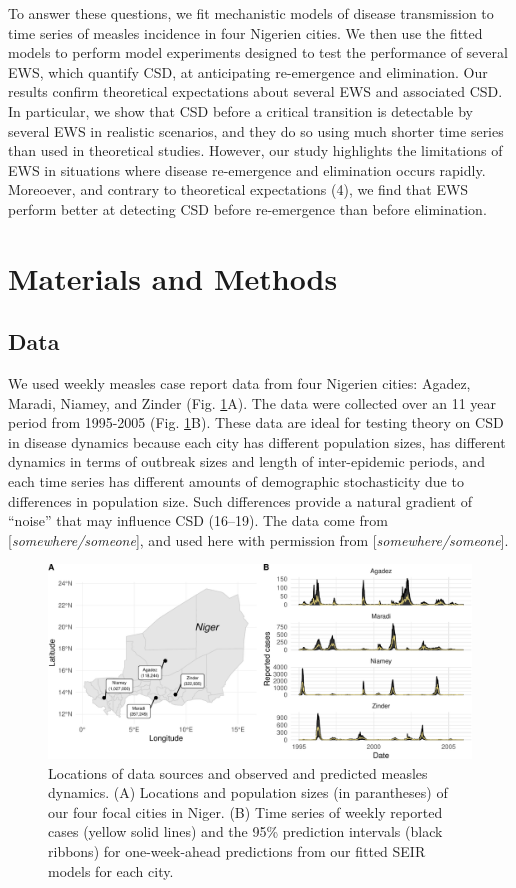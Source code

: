 \documentclass[3p]{elsarticle} %
\makeatletter
\def\maxwidth{\ifdim\Gin@nat@width>\linewidth\linewidth
\else\Gin@nat@width\fi}
\let\Oldincludegraphics\includegraphics
\renewcommand{\includegraphics}[1]{\Oldincludegraphics[width=\maxwidth]{#1}}
\makeatother
\begin{document}
To answer these questions, we fit mechanistic models of disease
transmission to time series of measles incidence in four Nigerien
cities. We then use the fitted models to perform model experiments
designed to test the performance of several EWS, which quantify CSD, at
anticipating re-emergence and elimination. Our results confirm
theoretical expectations about several EWS and associated CSD. In
particular, we show that CSD before a critical transition is detectable
by several EWS in realistic scenarios, and they do so using much shorter
time series than used in theoretical studies. However, our study
highlights the limitations of EWS in situations where disease
re-emergence and elimination occurs rapidly. Moreoever, and contrary to
theoretical expectations (4), we find that EWS perform better at
detecting CSD before re-emergence than before elimination.

\section{Materials and Methods}\label{materials-and-methods}

\subsection{Data}\label{data}

We used weekly measles case report data from four Nigerien cities:
Agadez, Maradi, Niamey, and Zinder (Fig. \ref{data-plot}A). The data
were collected over an 11 year period from 1995-2005 (Fig.
\ref{data-plot}B). These data are ideal for testing theory on CSD in
disease dynamics because each city has different population sizes, has
different dynamics in terms of outbreak sizes and length of
inter-epidemic periods, and each time series has different amounts of
demographic stochasticity due to differences in population size. Such
differences provide a natural gradient of ``noise'' that may influence
CSD (16--19). The data come from {[}\emph{somewhere/someone}{]}, and
used here with permission from {[}\emph{somewhere/someone}{]}.

\begin{figure}
\centering
\includegraphics{measles-ews-manuscript_files/figure-latex/data-plot-1.pdf}
\caption{Locations of data sources and observed and predicted measles
dynamics. (A) Locations and population sizes (in parantheses) of our
four focal cities in Niger. (B) Time series of weekly reported cases
(yellow solid lines) and the 95\% prediction intervals (black ribbons)
for one-week-ahead predictions from our fitted SEIR models for each
city. \label{data-plot}}
\end{figure}
\end{document}
